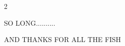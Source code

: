 \documentclass[
ngerman,
paper=a4,
asymmetric,
fontsize=9pt,
headings=small,
draft=false,
parskip=false,
footnotes=multiple,
]{scrbook}
\begin{document}
{
  \begin{gWideParEnv}
    {
      \begin{multicols}{2}
        \scriptsize
        \setlength{\parskip}{1pt}
        
      \end{multicols}
    \restoregeometry
    }
  \end{gWideParEnv}
}



% 


\clearpage
{\small
\printindex
}

SO LONG..........

AND THANKS FOR ALL THE FISH
\end{document}
